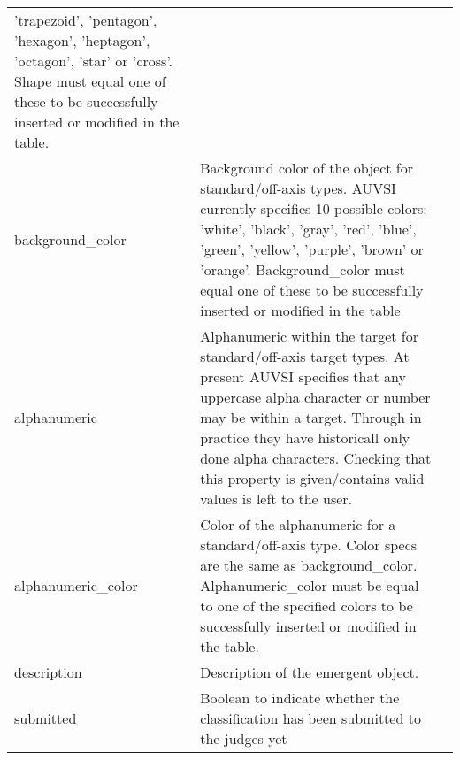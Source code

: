 \begin{longtable}{|p{\varnamewidth}|p{\vardescrwidth}|l}
          'trapezoid', 'pentagon', 'hexagon', 'heptagon', 'octagon', 'star'
          or 'cross'. Shape must equal one of these to be successfully 
          inserted or modified in the table.&\\
\cline{1-2}
\raggedright b\-a\-c\-k\-g\-r\-o\-u\-n\-d\-\_\-c\-o\-l\-o\-r\- & \raggedright Background color of the object for standard/off-axis types. AUVSI
          currently specifies 10 possible colors: 'white', 'black', 'gray',
          'red', 'blue', 'green', 'yellow', 'purple', 'brown' or 'orange'. 
          Background\_color must equal one of these to be successfully 
          inserted or modified in the table&\\
\cline{1-2}
\raggedright a\-l\-p\-h\-a\-n\-u\-m\-e\-r\-i\-c\- & \raggedright Alphanumeric within the target for standard/off-axis target 
          types. At present AUVSI specifies that any uppercase alpha 
          character or number may be within a target. Through in practice 
          they have historicall only done alpha characters. Checking that 
          this property is given/contains valid values is left to the user.&\\
\cline{1-2}
\raggedright a\-l\-p\-h\-a\-n\-u\-m\-e\-r\-i\-c\-\_\-c\-o\-l\-o\-r\- & \raggedright Color of the alphanumeric for a standard/off-axis type. Color 
          specs are the same as background\_color. Alphanumeric\_color must
          be equal to one of the specified colors to be successfully 
          inserted or modified in the table.&\\
\cline{1-2}
\raggedright d\-e\-s\-c\-r\-i\-p\-t\-i\-o\-n\- & \raggedright Description of the emergent object.&\\
\cline{1-2}
\raggedright s\-u\-b\-m\-i\-t\-t\-e\-d\- & \raggedright Boolean to indicate whether the classification has been submitted
          to the judges yet&\\
\cline{1-2}
\end{longtable}

